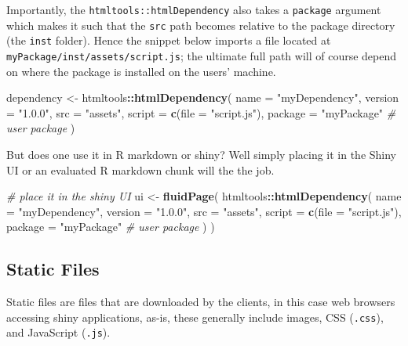 \documentclass[
]{krantz}
\makeatletter
\newenvironment{Shaded}{\begin{snugshade}}{\end{snugshade}}
\newcommand{\CommentTok}[1]{\textcolor[rgb]{0.37,0.37,0.37}{\textit{#1}}}
\newcommand{\DataTypeTok}[1]{\textcolor[rgb]{0.27,0.27,0.27}{#1}}
\newcommand{\KeywordTok}[1]{\textcolor[rgb]{0.27,0.27,0.27}{\textbf{#1}}}
\newcommand{\NormalTok}[1]{#1}
\newcommand{\OperatorTok}[1]{\textcolor[rgb]{0.43,0.43,0.43}{\textbf{#1}}}
\newcommand{\StringTok}[1]{\textcolor[rgb]{0.5,0.5,0.5}{#1}}
\newenvironment{kframe}{%
\medskip{}
\setlength{\fboxsep}{.8em}
 \def\at@end@of@kframe{}%
 \ifinner\ifhmode%
  \def\at@end@of@kframe{\end{minipage}}%
  \begin{minipage}{\columnwidth}%
 \fi\fi%
 \def\FrameCommand##1{\hskip\@totalleftmargin \hskip-\fboxsep
 \colorbox{shadecolor}{##1}\hskip-\fboxsep
     \hskip-\linewidth \hskip-\@totalleftmargin \hskip\columnwidth}%
 \MakeFramed {\advance\hsize-\width
   \@totalleftmargin\z@ \linewidth\hsize
   \@setminipage}}%
 {\par\unskip\endMakeFramed%
 \at@end@of@kframe}
\renewenvironment{Shaded}{\begin{kframe}}{\end{kframe}}
\makeatother
\begin{document}
Importantly, the \texttt{htmltools::htmlDependency} also takes a \texttt{package} argument which makes it such that the \texttt{src} path becomes relative to the package directory (the \texttt{inst} folder). Hence the snippet below imports a file located at \texttt{myPackage/inst/assets/script.js}; the ultimate full path will of course depend on where the package is installed on the users' machine.

\begin{Shaded}
\begin{Highlighting}[]
\NormalTok{dependency \textless{}{-}}\StringTok{ }\NormalTok{htmltools}\OperatorTok{::}\KeywordTok{htmlDependency}\NormalTok{(}
  \DataTypeTok{name =} \StringTok{"myDependency"}\NormalTok{,}
  \DataTypeTok{version =} \StringTok{"1.0.0"}\NormalTok{,}
  \DataTypeTok{src =} \StringTok{"assets"}\NormalTok{,}
  \DataTypeTok{script =} \KeywordTok{c}\NormalTok{(}\DataTypeTok{file =} \StringTok{"script.js"}\NormalTok{),}
  \DataTypeTok{package =} \StringTok{"myPackage"} \CommentTok{\# user package}
\NormalTok{)}
\end{Highlighting}
\end{Shaded}

But does one use it in R markdown or shiny? Well simply placing it in the Shiny UI or an evaluated R markdown chunk will the the job.

\begin{Shaded}
\begin{Highlighting}[]
\CommentTok{\# place it in the shiny UI}
\NormalTok{ui \textless{}{-}}\StringTok{ }\KeywordTok{fluidPage}\NormalTok{(}
\NormalTok{  htmltools}\OperatorTok{::}\KeywordTok{htmlDependency}\NormalTok{(}
    \DataTypeTok{name =} \StringTok{"myDependency"}\NormalTok{,}
    \DataTypeTok{version =} \StringTok{"1.0.0"}\NormalTok{,}
    \DataTypeTok{src =} \StringTok{"assets"}\NormalTok{,}
    \DataTypeTok{script =} \KeywordTok{c}\NormalTok{(}\DataTypeTok{file =} \StringTok{"script.js"}\NormalTok{),}
    \DataTypeTok{package =} \StringTok{"myPackage"} \CommentTok{\# user package}
\NormalTok{  )}
\NormalTok{)}
\end{Highlighting}
\end{Shaded}

\hypertarget{basics-static-files}{%
\subsection{Static Files}\label{basics-static-files}}

Static files are files that are downloaded by the clients, in this case web browsers accessing shiny applications, as-is, these generally include images, CSS (\texttt{.css}), and JavaScript (\texttt{.js}).
\end{document}
